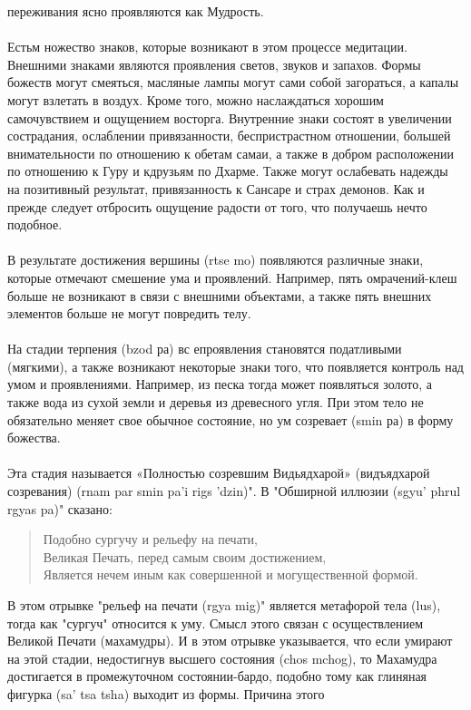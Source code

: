 переживания ясно проявляются как Мудрость.\\
\\
Естьм ножество знаков, которые возникают в этом процессе медитации. Внешними
знаками являются проявления светов, звуков и запахов. Формы божеств могут смеяться,
масляные лампы могут сами собой загораться, а капалы могут взлетать в воздух. Кроме того,
можно наслаждаться хорошим самочувствием и ощущением восторга. Внутренние знаки
состоят в увеличении сострадания, ослаблении привязанности, беспристрастном отношении,
большей внимательности по отношению к обетам самаи, а также в добром расположении по
отношению к Гуру и кдрузьям по Дхарме. Также могут ослабевать надежды на позитивный
результат, привязанность к Сансаре и страх демонов. Как и прежде следует отбросить
ощущение радости от того, что получаешь нечто подобное.\\
\\
В результате достижения вершины (rtse mo) появляются различные знаки, которые
отмечают смешение ума и проявлений. Например, пять омрачений-клеш больше не
возникают в связи с внешними объектами, а также пять внешних элементов больше не могут
повредить телу.\\
\\
На стадии терпения (bzod ра) вс епроявления становятся податливыми (мягкими), а
также возникают некоторые знаки того, что появляется контроль над умом и проявлениями.
Например, из песка тогда может появляться золото, а также вода из сухой земли и деревья из
древесного угля. При этом тело не обязательно меняет свое обычное состояние, но ум
созревает (smin ра) в форму божества.\\
\\
Эта стадия называется «Полностью созревшим Видьядхарой» (видъядхарой созревания)
(rnam par smin pa'i rigs 'dzin)". В "Обширной иллюзии (sgyu' phrul rgyas pa)"
сказано:
\begin{verse}
Подобно сургучу и рельефу на печати,\\
Великая Печать, перед самым своим достижением,\\
Является нечем иным как совершенной и могущественной формой.
\end{verse}
В этом отрывке "рельеф на печати (rgya mig)" является метафорой тела (lus), тогда как
"сургуч" относится к уму. Смысл этого связан с осуществлением Великой Печати
(махамудры). И в этом отрывке указывается, что если умирают на этой стадии, недостигнув
высшего состояния (chos mchog), то Махамудра достигается в промежуточном состоянии-бардо,
подобно тому как глиняная фигурка (sa' tsa tsha) выходит из формы. Причина этого
